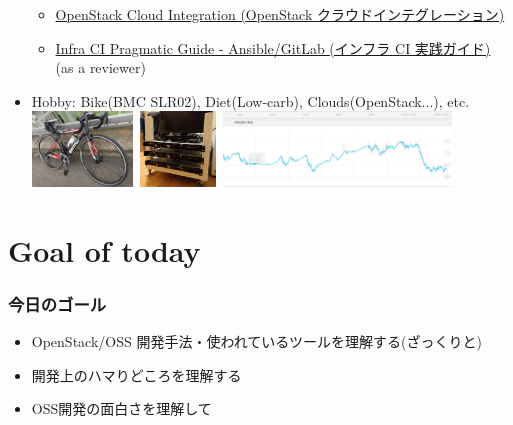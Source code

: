 \documentclass[aspectratio=169,11pt,hyperref={colorlinks=true}]{beamer}
\begin{document}
\begin{frame}
\begin{itemize}
      \begin{itemize}
      \item \href{https://www.amazon.co.jp/dp/4798139785/}{\scriptsize{OpenStack
        Cloud Integration (OpenStack クラウドインテグレーション)}}
      \item \href{https://www.amazon.co.jp/dp/4798155128/}{\scriptsize{Infra CI
        Pragmatic Guide - Ansible/GitLab (インフラ CI 実践ガイド)}} (as a reviewer)
      \end{itemize}
    \item Hobby: Bike(BMC SLR02), Diet(Low-carb), Clouds(OpenStack...), etc.
    \includegraphics[height=20mm]{my-bike.jpg}~\includegraphics[height=20mm]{server_front.jpg}~\includegraphics[height=20mm]{my-weight.png}
  \end{itemize}
\end{frame}

\section{Goal of today}
\begin{frame}
  \frametitle{今日のゴール}
  \begin{itemize}
    \item OpenStack/OSS 開発手法・使われているツールを理解する(ざっくりと)
    \item 開発上のハマりどころを理解する
    \item OSS開発の面白さを理解して
  \end{itemize}
\end{frame}
\end{document}
